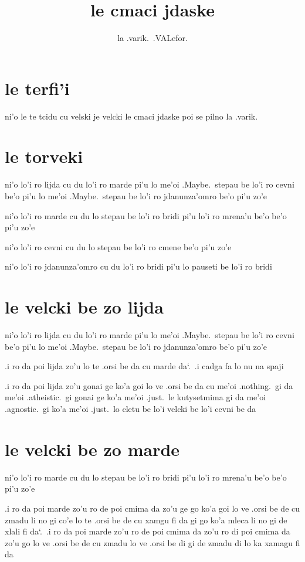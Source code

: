 \documentclass{report}
\title{le cmaci jdaske}
\author{la .varik.\ .VALefor.}
\newcommand\sds{\spacefactor\sfcode`.\ \space}
\newcommand\lijdyvelcki{lo'i ro lijda cu du lo'i ro marde pi'u lo me'oi .Maybe.\ stepau be lo'i ro cevni be'o pi'u lo me'oi .Maybe.\ stepau be lo'i ro jdanunza'omro be'o pi'u zo'e}
\newcommand\mardyvelcki{lo'i ro marde cu du lo stepau be lo'i ro bridi pi'u lo'i ro mrena'u be'o be'o pi'u zo'e}
\newcommand\cevnyvelcki{lo'i ro cevni cu du lo stepau be lo'i ro cmene be'o pi'u zo'e}
\newcommand\jdanunzahomrovelcki{lo'i ro jdanunza'omro cu du lo'i ro bridi pi'u lo pauseti be lo'i ro bridi}
\begin{document}
\maketitle{}
\tableofcontents{}
\chapter{le terfi'i}
ni'o le te tcidu cu velski je velcki le cmaci jdaske poi se pilno la .varik.

\chapter{le torveki}
ni'o \lijdyvelcki

ni'o \mardyvelcki

ni'o \cevnyvelcki

ni'o \jdanunzahomrovelcki

\chapter{le velcki be zo lijda}
ni'o \lijdyvelcki

.i ro da poi lijda zo'u lo te .orsi be da cu marde da\sds  .i cadga fa lo nu na spaji

.i ro da poi lijda zo'u gonai ge ko'a goi lo ve .orsi be da cu me'oi .nothing.\ gi da me'oi .atheistic.\ gi gonai ge ko'a me'oi .just.\ le kutysetmima gi da me'oi .agnostic.\ gi ko'a me'oi .just.\ lo cletu be lo'i velcki be lo'i cevni be da

\chapter{le velcki be zo marde}
ni'o \mardyvelcki

.i ro da poi marde zo'u ro de poi cmima da zo'u ge go ko'a goi lo ve .orsi be de cu zmadu li no gi co'e lo te .orsi be de cu xamgu fi da gi go ko'a mleca li no gi de xlali fi da\sds .i ro da poi marde zo'u ro de poi cmima da zo'u ro di poi cmima da zo'u go lo ve .orsi be de cu zmadu lo ve .orsi be di gi de zmadu di lo ka xamagu fi da
\end{document}
